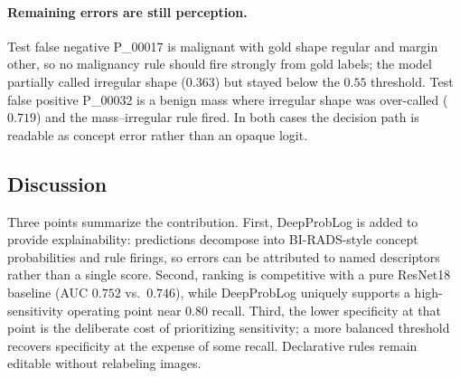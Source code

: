 \paragraph{Remaining errors are still perception.}
Test false negative P\_00017 is malignant with gold shape regular and margin other, so no malignancy rule should fire strongly from gold labels; the model partially called irregular shape ($0.363$) but stayed below the $0.55$ threshold. Test false positive P\_00032 is a benign mass where irregular shape was over-called ($0.719$) and the mass--irregular rule fired. In both cases the decision path is readable as concept error rather than an opaque logit.

\subsection{Discussion}
\label{sec:discussion}

Three points summarize the contribution. First, DeepProbLog is added to provide explainability: predictions decompose into BI-RADS-style concept probabilities and rule firings, so errors can be attributed to named descriptors rather than a single score. Second, ranking is competitive with a pure ResNet18 baseline (AUC $0.752$ vs.\ $0.746$), while DeepProbLog uniquely supports a high-sensitivity operating point near $0.80$ recall. Third, the lower specificity at that point is the deliberate cost of prioritizing sensitivity; a more balanced threshold recovers specificity at the expense of some recall. Declarative rules remain editable without relabeling images.
